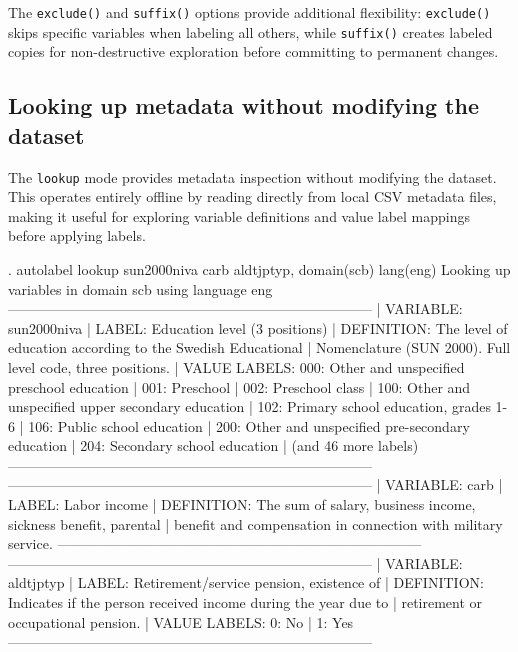 The \texttt{exclude()} and \texttt{suffix()} options provide additional flexibility: \texttt{exclude()} skips specific variables when labeling all others, while \texttt{suffix()} creates labeled copies for non-destructive exploration before committing to permanent changes.

\subsection{Looking up metadata without modifying the dataset}

The \texttt{lookup} mode provides metadata inspection without modifying the dataset. This operates entirely offline by reading directly from local CSV metadata files, making it useful for exploring variable definitions and value label mappings before applying labels.

\begin{stlog}
. autolabel lookup sun2000niva carb aldtjptyp, domain(scb) lang(eng)
Looking up variables in domain scb using language eng
------------------------------------------------------------------------------
| VARIABLE:     sun2000niva
| LABEL:        Education level (3 positions)
| DEFINITION:   The level of education according to the Swedish Educational
|               Nomenclature (SUN 2000). Full level code, three positions.
| VALUE LABELS: 000: Other and unspecified preschool education
|               001: Preschool
|               002: Preschool class
|               100: Other and unspecified upper secondary education
|               102: Primary school education, grades 1-6
|               106: Public school education
|               200: Other and unspecified pre-secondary education
|               204: Secondary school education
|               (and 46 more labels)
------------------------------------------------------------------------------
------------------------------------------------------------------------------
| VARIABLE:     carb
| LABEL:        Labor income
| DEFINITION:   The sum of salary, business income, sickness benefit, parental
|               benefit and compensation in connection with military service.
------------------------------------------------------------------------------
------------------------------------------------------------------------------
| VARIABLE:     aldtjptyp
| LABEL:        Retirement/service pension, existence of
| DEFINITION:   Indicates if the person received income during the year due to
|               retirement or occupational pension.
| VALUE LABELS: 0: No
|               1: Yes
------------------------------------------------------------------------------
\end{stlog}






